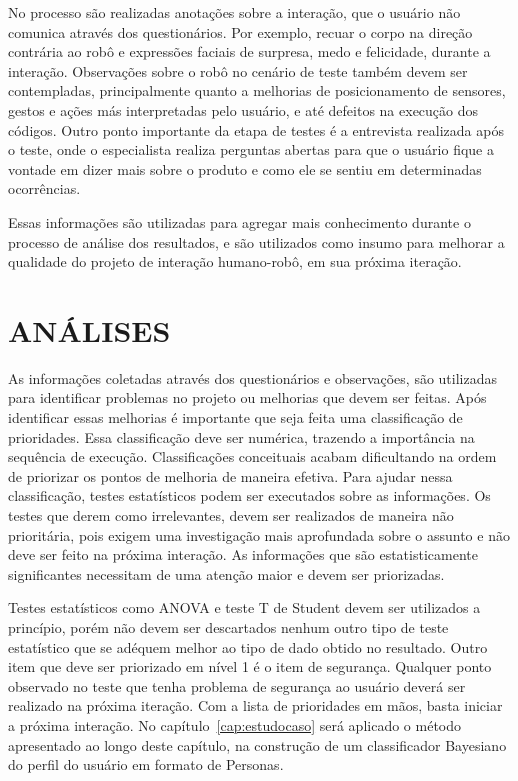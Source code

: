 No processo são realizadas anotações sobre a interação, que o usuário não comunica através dos questionários. Por exemplo, recuar o corpo na direção contrária ao robô e expressões faciais de surpresa, medo e felicidade, durante a interação. Observações sobre o robô no cenário de teste também devem ser contempladas, principalmente quanto a melhorias de posicionamento de sensores, gestos e ações más interpretadas pelo usuário, e até defeitos na execução dos códigos. Outro ponto importante da etapa de testes é a entrevista realizada após o teste, onde o especialista realiza perguntas abertas para que o usuário fique a vontade em dizer mais sobre o produto e como ele se sentiu em determinadas ocorrências.

Essas informações são utilizadas para agregar mais conhecimento durante o processo de análise dos resultados, e são utilizados como insumo para melhorar a qualidade do projeto de interação humano-robô, em sua próxima iteração.

\section{ANÁLISES}
\label{sec:analise}
As informações coletadas através dos questionários e observações, são utilizadas para identificar problemas no projeto ou melhorias que devem ser feitas. Após identificar essas melhorias é importante que seja feita uma classificação de prioridades. Essa classificação deve ser numérica, trazendo a importância na sequência de execução. Classificações conceituais acabam dificultando na ordem de priorizar os pontos de melhoria de maneira efetiva. Para ajudar nessa classificação, testes estatísticos podem ser executados sobre as informações. Os testes que derem como irrelevantes, devem ser realizados de maneira não prioritária, pois exigem uma investigação mais aprofundada sobre o assunto e não deve ser feito na próxima interação. As informações que são estatisticamente significantes necessitam de uma atenção maior e devem ser priorizadas. 

Testes estatísticos como ANOVA e teste T de Student devem ser utilizados a princípio, porém não devem ser descartados nenhum outro tipo de teste estatístico que se adéquem melhor ao tipo de dado obtido no resultado. Outro item que deve ser priorizado em nível 1 é o item de segurança. Qualquer ponto observado no teste que tenha problema de segurança ao usuário deverá ser realizado na próxima iteração. Com a lista de prioridades em mãos, basta iniciar a próxima interação. No capítulo~\ref{cap:estudocaso} será aplicado o método apresentado ao longo deste capítulo, na construção de um classificador Bayesiano do perfil do usuário em formato de Personas.